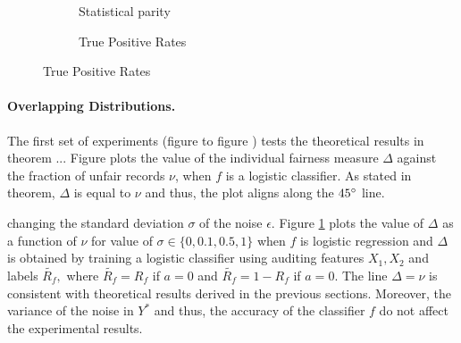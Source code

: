 \documentclass{article}
\begin{document}
\begin{figure}
\begin{subfigure} {.5\linewidth}
\caption{Statistical parity}
\label{fig: 1a}
\end{subfigure}
\begin{subfigure} {.5\linewidth}
\caption{True Positive Rates}
\label{fig: 1b}
\end{subfigure}

\end{figure}

\paragraph{Overlapping Distributions.}
The first set of experiments (figure to figure ) tests the theoretical results in theorem ... Figure plots the value of the individual fairness measure $\Delta$ against the fraction of unfair records $\nu$, when $f$ is a logistic classifier. As stated in theorem, $\Delta$ is equal to $\nu$ and thus, the plot aligns along the $45\degree$ line. 

changing the standard deviation $\sigma$ of the noise $\epsilon$. Figure \ref{fig: 1a} plots the value of $\Delta$ as a function of $\nu$ for value of $\sigma\in \{0, 0.1, 0.5, 1\}$ when $f$ is logistic regression and $\Delta$ is obtained by training a logistic classifier using auditing features $X_{1}, X_{2}$ and labels $\tilde{R_{f}},$ where  $\tilde{R_{f}}=R_{f}$ if $a=0$ and  $\tilde{R_{f}}=1 -R_{f}$ if $a=0$. The line $\Delta=\nu$ is consistent with theoretical results derived in the previous sections. Moreover, the variance of the noise in $Y^{*}$ and thus, the accuracy of the classifier $f$ do not affect the experimental results.
\end{document}
